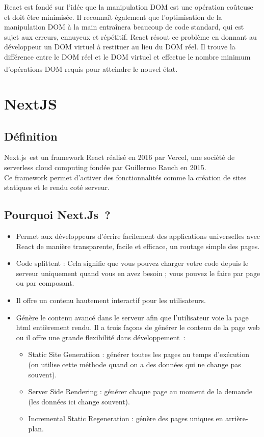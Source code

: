 \documentclass[12pt]{report}
\begin{document}
\vspace*{0.2in}
React est fondé sur l’idée que la manipulation DOM est une opération coûteuse et doit être minimisée. Il reconnaît également que l’optimisation de la manipulation DOM à la main entraînera beaucoup de code standard, qui est sujet aux erreurs, ennuyeux et répétitif. React résout ce problème en donnant au développeur un DOM virtuel à restituer au lieu du DOM réel. Il trouve la différence entre le DOM réel et le DOM virtuel et effectue le nombre minimum d’opérations DOM requis pour atteindre le nouvel état. \textsuperscript{\cite{vipul2016reactjs}}

\section{NextJS}
\subsection{Définition}
\vspace{0.1in}
Next.js est un framework React réalisé en 2016 par Vercel, une société de serverless cloud computing fondée par Guillermo Rauch en 2015.
\\
Ce framework permet d’activer des fonctionnalités comme la création de sites statiques et le rendu coté serveur.

\subsection{Pourquoi Next.Js ?}
\vspace{0.1in}
\begin{itemize}
    \item Permet aux développeurs d'écrire facilement des applications universelles avec React de manière transparente, facile et efficace, un routage simple des pages.
    \item Code splittent : Cela signifie que vous pouvez charger votre code depuis le serveur uniquement quand vous en avez besoin ; vous pouvez le faire par page ou par composant.
    \item Il offre un contenu hautement interactif pour les utilisateurs.
    \item Génère le contenu avancé dans le serveur afin que l'utilisateur voie la page html entièrement rendu. Il a trois façons de générer le contenu de la page web ou il offre une grande flexibilité dans développement :
    \begin{itemize}
        \item Static Site Generatiion : générer toutes les pages au temps d’exécution (on utilise cette méthode quand on a des données qui ne change pas souvent).
        \item Server Side Rendering : générer chaque page au moment de la demande (les données ici change souvent).
        \item Incremental Static Regeneration : génère des pages uniques en arrière-plan.
    \end{itemize}
\end{itemize}
\end{document}
